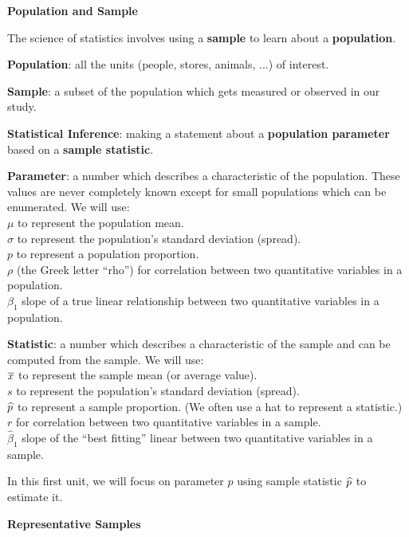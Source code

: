 \def\theTopic{Readings 2}

\begin{center}
{\bf {\large Population and Sample}}
\end{center}

The science of statistics involves using a {\bf sample} to learn about
a {\bf population}.

{\bf Population}: all the units (people, stores, animals, ...) of
interest.

{\bf Sample}:  a subset of the population which gets measured or
observed in our study.

{\bf Statistical  Inference}: making a statement about a
{\bf population parameter} based on a {\bf  sample statistic}.

{\bf Parameter}:  a number which describes a characteristic of the
population. These values are never completely known except for small
populations which can be enumerated. We will use:\\
  $\mu$ to represent the population mean.\\
  $\sigma$ to represent the population's standard deviation
  (spread).\\
  $p$  to represent a population proportion.\\
  $\rho$ (the Greek letter ``rho'') for correlation between two
  quantitative variables in a population.\\
  $\beta_1$ slope of a true linear relationship between  two
  quantitative variables in a population.

{\bf Statistic}:  a number which describes a characteristic of the
sample and can be computed from the sample. We will use:\\
  $\overline{x}$ to represent the sample mean (or average value).\\
  $s$  to represent the population's standard deviation
  (spread).\\
  $\widehat{p}$  to represent a sample proportion.  (We often use a hat to
  represent a statistic.)\\
  $r$  for correlation between two  quantitative variables in a sample.\\
  $\widehat{\beta}_1$ slope of the ``best fitting'' linear  between  two
  quantitative variables in a sample.

In this first unit, we will focus on parameter $p$ using sample
statistic $\widehat{p}$ to estimate it.

\begin{center}
  {\bf Representative Samples}
\end{center}

